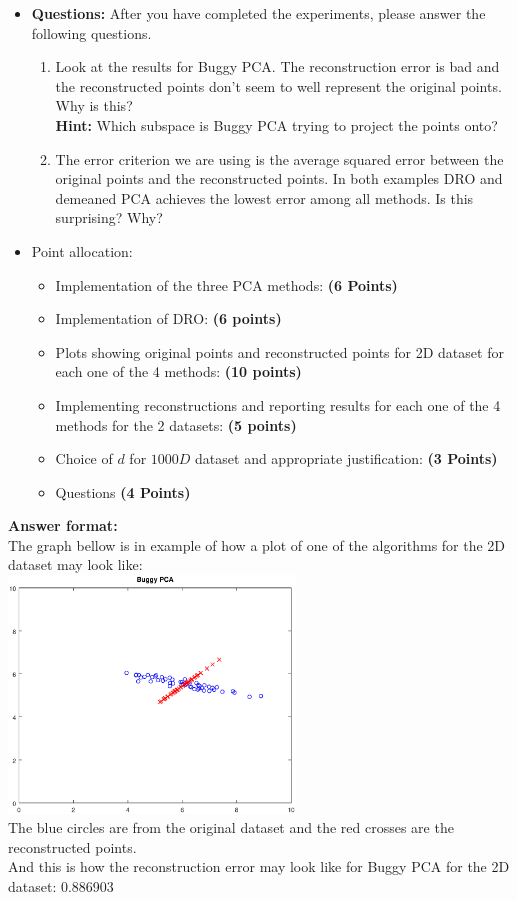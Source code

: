 \documentclass[a4paper]{article}
\newcounter{thm}
\theoremstyle{definition}
\begin{document}
\begin{itemize}
\item \textbf{Questions:} After you have completed the experiments, please answer the following questions.
\begin{enumerate}
\item Look at the results for Buggy PCA. The reconstruction error is bad and the
reconstructed points don't seem to well represent the original points. Why is
this? \\
\textbf{Hint: } Which subspace is Buggy PCA trying to project the points
onto?
\item The error criterion we are using is the average squared error 
between the original points and the reconstructed points.
In both examples DRO and demeaned PCA achieves the lowest error among all
methods. 
Is this surprising? Why?
\end{enumerate}

\item Point allocation:
\begin{itemize}
\item Implementation of the three PCA methods: \textbf{(6 Points)}
\item Implementation of DRO: \textbf{(6 points)}
\item Plots showing original points and reconstructed points for 2D dataset for each one of the 4 methods: \textbf{(10 points)}
\item Implementing reconstructions and reporting results for each one of the 4 methods for the 2 datasets: \textbf{(5 points)}
\item Choice of $d$ for $1000D$ dataset and appropriate justification:
\textbf{(3 Points)}
\item Questions \textbf{(4 Points)}
\end{itemize}

\end{itemize}



\vspace{0.2in}

\textbf{Answer format:}  \\
The graph bellow is in example of how a plot of one of the algorithms for the 2D dataset may look like: \\
\includegraphics[width=3in]{buggy_pca} \hspace{0.4in}
\\

The blue circles are from the original dataset and the red crosses are the reconstructed points. \\

And this is how the reconstruction error may look like for Buggy PCA for the 2D dataset: 0.886903


\end{document}
